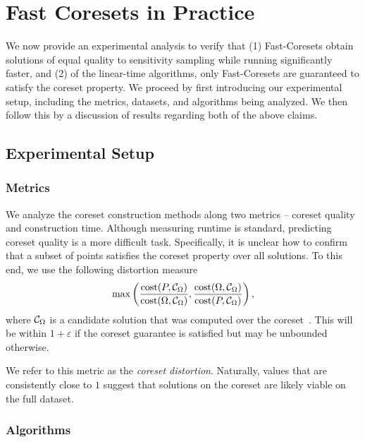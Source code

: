 \section{Fast Coresets in Practice}

We now provide an experimental analysis to verify that (1) Fast-Coresets obtain solutions of equal quality to sensitivity sampling while running significantly
faster, and (2) of the linear-time algorithms, only Fast-Coresets are guaranteed to satisfy the coreset property. We proceed by first
introducing our experimental setup, including the metrics, datasets, and algorithms being analyzed. We then follow this by a discussion of results regarding
both of the above claims.

\subsection{Experimental Setup}
\subsubsection{Metrics}

We analyze the coreset construction methods along two metrics -- coreset quality and construction time.  Although measuring runtime is standard, predicting coreset
quality is a more difficult task. Specifically, it is unclear how to confirm that a subset of points satisfies the coreset property over all solutions. To this
end, we use the following distortion measure
\[ \max \left( \dfrac{\operatorname{cost}(P, \mathcal C_{\Omega})}{\operatorname{cost}(\Omega, \mathcal C_{\Omega})}, \dfrac{\operatorname{cost}(\Omega, \mathcal C_{\Omega})}{\operatorname{cost}(P, \mathcal C_{\Omega})} \right),\]
where $\mathcal C_{\Omega}$ is a candidate solution that was computed over the coreset~\cite{chrisESA}. This will be within
$1+\varepsilon$ if the coreset guarantee is satisfied but may be unbounded otherwise. 

We refer to this metric as the \emph{coreset distortion}. Naturally, values that are consistently close to $1$ suggest that solutions on the coreset are likely
viable on the full dataset.


\subsubsection{Algorithms}
\label{ssec:algorithms}


